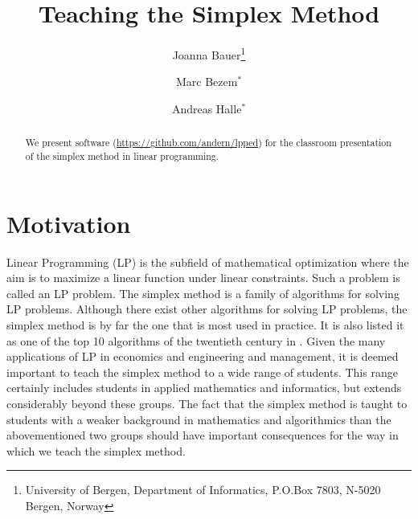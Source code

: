 \documentclass[ukenglish]{nik}
\begin{document}
\title{Teaching the Simplex Method}

\author{
Joanna Bauer\thanks{University of Bergen, Department of Informatics, P.O.Box 7803, N-5020 Bergen, Norway}
\and
Marc Bezem$^*$
\and
Andreas Halle$^*$}
\maketitle

\begin{abstract}
We present software (\url{https://github.com/andern/lpped})
for the classroom presentation of the simplex method in linear programming.
\end{abstract}

\section{Motivation}
Linear Programming (LP) is the subfield of mathematical optimization where
the aim is to maximize a linear function under linear constraints. Such a problem
is called an LP problem. The simplex method is a family of algorithms for solving LP problems. 
Although there exist other algorithms for solving LP problems,
the simplex method is by far the one that is most used in practice.
It is also listed it as one of the top 10 algorithms of the twentieth century in
\cite{CiSaE2000}. Given the many applications of LP in economics and engineering and
management, it is deemed important to teach the simplex method to a wide range of
students. This range certainly includes students in applied mathematics and informatics,
but extends considerably beyond these groups. The fact that the simplex method is
taught to students with a weaker background in mathematics and algorithmics than
the abovementioned two groups should have important consequences for the way
in which we teach the simplex method.
\end{document}
